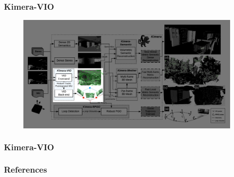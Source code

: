 \documentclass[11pt]{beamer}
\begin{document}
\begin{frame}
\frametitle{Kimera-VIO}
\begin{figure}
    \includegraphics[width=\linewidth]{kimera_chart_VIO.jpeg} 
\end{figure}
\end{frame}
\begin{frame}
    \frametitle{Kimera-VIO} 
    \begin{figure}[ht]
        \centering
    \end{figure}
\end{frame}
\begin{frame}[allowframebreaks]
\footnotesize
  \frametitle{References}
  
{}
\end{frame}
\end{document}
